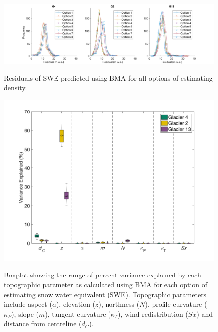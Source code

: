 \documentclass[12pt]{article}
\begin{document}
\begin{landscape}
\begin{figure}
	\centering
	\includegraphics[height = 0.4\textwidth]{BMSresiduals_all.png}\\
	\caption{Residuals of SWE predicted using BMA for all options of estimating density.}
	\label{fig:BMSresiduals_all}
\end{figure}

\end{landscape}
 
\begin{figure}[H]
	\centering
	\includegraphics[width =1.1 \textwidth]{BMSCoeffs_DensityOpts.png}\\
	\caption{Boxplot showing the range of percent variance explained by each topographic parameter as calculated using BMA for each option of estimating snow water equivalent (SWE). Topographic parameters include aspect ($\alpha$), elevation ($z$), northness ($N$), profile curvature ($\kappa_P$), slope ($m$), tangent curvature ($\kappa_T$), wind redistribution ($Sx$) and distance from centreline ($d_C$).}
	\label{fig:PercentVar_densityOptions}
\end{figure} 



	
\pagebreak


\end{document}
